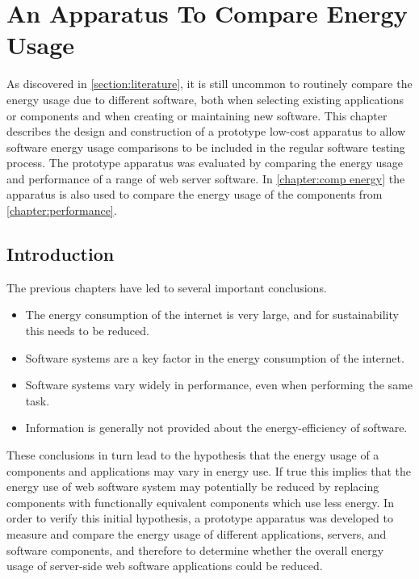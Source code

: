 \chapter{An Apparatus To Compare Energy Usage}
\label{chapter:testrig}

As discovered in \autoref{section:literature}, it is still uncommon to routinely compare the energy usage due to different software, both when selecting existing applications or components and when creating or maintaining new software. This chapter describes the design and construction of a prototype low-cost apparatus to allow software energy usage comparisons to be included in the regular software testing process. The prototype apparatus was evaluated by comparing the energy usage and performance of a range of web server software. In \autoref{chapter:comp energy} the apparatus is also used to compare the energy usage of the components from \autoref{chapter:performance}.

\section{Introduction}
\label{section:rig introduction}

The previous chapters have led to several important conclusions.

\begin{itemize}
\item The energy consumption of the internet is very large, and for sustainability this needs to be reduced.
\item Software systems are a key factor in the energy consumption of the internet.
\item Software systems vary widely in performance, even when performing the same task.
\item Information is generally not provided about the energy-efficiency of software.
\end{itemize}

These conclusions in turn lead to the hypothesis that the energy usage of a components and applications may vary in energy use. If true this implies that the energy use of web software system may potentially be reduced by replacing components with functionally equivalent components which use less energy. In order to verify this initial hypothesis, a prototype apparatus was developed to measure and compare the energy usage of different applications, servers, and software components, and therefore to determine whether the overall energy usage of server-side web software applications could be reduced.

